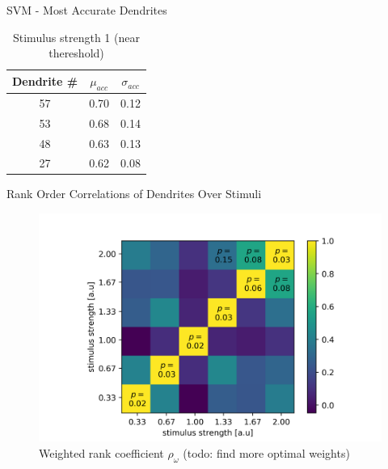 \documentclass[10pt]{beamer}
\begin{document}
\begin{frame}[fragile]{SVM - Most Accurate Dendrites}
\begin{table}
    \caption*{Stimulus strength 1 (near thereshold)}
    \begin{tabular}{c|c|c}
      \toprule
      Dendrite \# & $\mu_{acc}$ & $\sigma_{acc}$\\
      \midrule
      57 & 0.70 & 0.12\\
      53 & 0.68 & 0.14\\
      48 & 0.63 & 0.13\\
      27 & 0.62 & 0.08\\
      \bottomrule
    \end{tabular}
  \end{table}
\end{frame}

\begin{frame}[fragile]{Rank Order Correlations of Dendrites Over Stimuli}
\begin{center}
	\begin{figure}\caption*{Weighted rank coefficient $\rho_{\omega}$ (todo: find more optimal weights)}
      \includegraphics[width=1.0\textwidth]{rank_presence.png}
	\end{figure}
	\end{center}
\end{frame}
\end{document}
